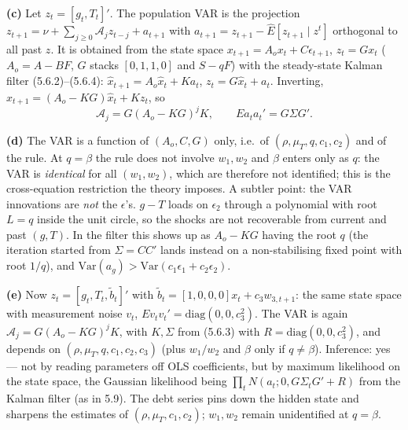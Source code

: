 \documentclass[12pt, letterpaper]{article}
\begin{document}
\begin{tcolorbox}[evenbox,title={Exercise 5.8 \quad Tax smoothing and a VAR for $[g_t,T_t]$}]
\textbf{(c)} Let $z_t=[g_t,T_t]'$. The population VAR is the projection
$z_{t+1}=\nu+\sum_{j\ge0}\mathcal A_jz_{t-j}+a_{t+1}$ with $a_{t+1}=z_{t+1}-\hat E[z_{t+1}\mid z^t]$
orthogonal to all past $z$. It is obtained from the state space
$x_{t+1}=A_ox_t+C\epsilon_{t+1}$, $z_t=Gx_t$ ($A_o=A-BF$, $G$ stacks $[0,1,1,0]$ and $S-qF$) with
the steady-state Kalman filter (5.6.2)--(5.6.4): $\hat x_{t+1}=A_o\hat x_t+Ka_t$, $z_t=G\hat x_t+a_t$.
Inverting, $\hat x_{t+1}=(A_o-KG)\hat x_t+Kz_t$, so
\[
\mathcal A_j=G(A_o-KG)^jK,\qquad Ea_ta_t'=G\Sigma G'.
\]

\textbf{(d)} The VAR is a function of $(A_o,C,G)$ only, i.e.\ of $(\rho,\mu_T,q,c_1,c_2)$ and of the
rule. At $q=\beta$ the rule does not involve $w_1,w_2$ and $\beta$ enters only as $q$: the VAR is
\emph{identical} for all $(w_1,w_2)$, which are therefore not identified; this is the cross-equation
restriction the theory imposes. A subtler point: the VAR innovations are \emph{not} the
$\epsilon$'s. $g-T$ loads on $\epsilon_2$ through a polynomial with root $L=q$ inside the unit
circle, so the shocks are not recoverable from current and past $(g,T)$. In the filter this shows up
as $A_o-KG$ having the root $q$ (the iteration started from $\Sigma=CC'$ lands instead on a
non-stabilising fixed point with root $1/q$), and $\mathrm{Var}(a_g)>\mathrm{Var}(c_1\epsilon_1+c_2\epsilon_2)$.

\textbf{(e)} Now $z_t=[g_t,T_t,\tilde b_t]'$ with $\tilde b_t=[1,0,0,0]x_t+c_3w_{3,t+1}$: the same
state space with measurement noise $v_t$, $Ev_tv_t'=\mathrm{diag}(0,0,c_3^2)$. The VAR is again
$\mathcal A_j=G(A_o-KG)^jK$, with $K,\Sigma$ from (5.6.3) with $R=\mathrm{diag}(0,0,c_3^2)$, and
depends on $(\rho,\mu_T,q,c_1,c_2,c_3)$ (plus $w_1/w_2$ and $\beta$ only if $q\ne\beta$). Inference:
yes --- not by reading parameters off OLS coefficients, but by maximum likelihood on the state space,
the Gaussian likelihood being $\prod_t N(a_t;0,G\Sigma_tG'+R)$ from the Kalman filter (as in
5.9). The debt series pins down the hidden state and sharpens the estimates of $(\rho,\mu_T,c_1,c_2)$;
$w_1,w_2$ remain unidentified at $q=\beta$.


\end{tcolorbox}
\end{document}
